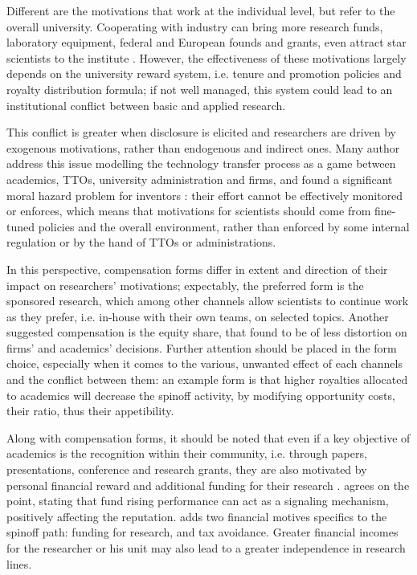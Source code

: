 Different are the motivations that work at the individual level, but refer to the overall university. Cooperating with industry can bring more research funds, laboratory equipment, federal and European founds and grants, even attract star scientists to the institute \citep{OShea2004, Baldini2007, DEste2007}. However, the effectiveness of these motivations largely depends on the university reward system, i.e. tenure and promotion policies and royalty distribution formula; if not well managed, this system could lead to an institutional conflict between basic and applied research. 

This conflict is greater when disclosure is elicited and researchers are driven by exogenous motivations, rather than endogenous and indirect ones. Many author address this issue modelling the technology transfer process as a game between academics, TTOs, university administration and firms, and found a significant moral hazard problem for inventors \citep{Jensen1998}: their effort cannot be effectively monitored or enforces, which means that motivations for scientists should come from fine-tuned policies and the overall environment, rather than enforced by some internal regulation or by the hand of TTOs or administrations. 

In this perspective, compensation forms differ in extent and direction of their impact on researchers' motivations; expectably, the preferred form is the sponsored research, which among other channels allow scientists to continue work as they prefer, i.e. in-house with their own teams, on selected topics. Another suggested compensation is the equity share, that \citet{Jensen1998} found to be of less distortion on firms' and academics' decisions. Further attention should be placed in the form choice, especially when it comes to the various, unwanted effect of each channels and the conflict between them: an example form \citet{OShea2004} is that higher royalties allocated to academics will decrease the spinoff activity, by modifying opportunity costs, their ratio, thus their appetibility.

Along with compensation forms, it should be noted that even if a key objective of academics is the recognition within their community, i.e. through papers, presentations, conference and research grants, they are also motivated by personal financial reward and additional funding for their research \citep{Siegel2003a, Link2007, Fini2009}. \citet{DEste2007, DEste2011} agrees on the point, stating that fund rising performance can act as a signaling mechanism, positively affecting the reputation. \citet{Rizzo2015} adds two financial motives specifics to the spinoff path: funding for research, and tax avoidance. Greater financial incomes for the researcher or his unit may also lead to a greater independence in research lines.

